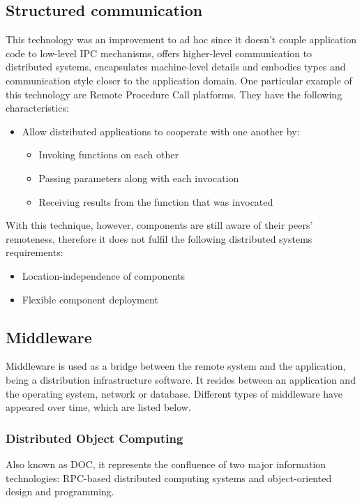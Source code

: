     \subsection{Structured communication}
    This technology was an improvement to ad hoc since it doesn't couple application code
    to low-level IPC mechanisms, offers higher-level communication to distributed systems,
    encapsulates machine-level details and embodies types and communication style closer
    to the application domain. One particular example of this technology are Remote
    Procedure Call platforms. They have the following characteristics:

    \begin{itemize}
        \item Allow distributed applications to cooperate with one another by:
        \begin{itemize}
            \item Invoking functions on each other
            \item Passing parameters along with each invocation
            \item Receiving results from the function that was invocated
        \end{itemize}
    \end{itemize}

    With this technique, however, components are still aware of their peers' remoteness, therefore
    it does not fulfil the following distributed systems requirements:
    \begin{itemize}
        \item Location-independence of components
        \item Flexible component deployment
    \end{itemize}

    \subsection{Middleware}
    Middleware is used as a bridge between the remote system and the application, being a distribution infrastructure
    software. It resides between an application and the operating system, network or database. Different types of
    middleware have appeared over time, which are listed below.

    \subsubsection{Distributed Object Computing}
    Also known as DOC, it represents the confluence of two major information technologies:
    RPC-based distributed computing systems and object-oriented design and programming.

